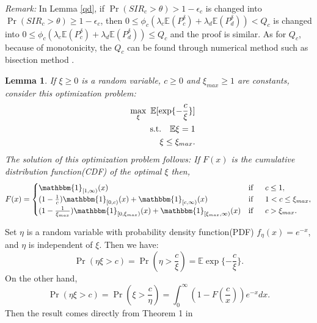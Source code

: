 \documentclass[12pt, draftclsnofoot, journal, letterpaper, onecolumn]{IEEEtran}
\newtheorem{lemma}{Lemma}[section]
\begin{document}
\emph{Remark:} In Lemma \ref{qd}, if $\Pr(SIR_c>\theta)>1-\epsilon_c$ is changed into $\Pr(SIR_c>\theta)\geq1-\epsilon_c$, then $0\leq\phi_c(\lambda_c\mathbb{E}(P_c^{\delta})+\lambda_d\mathbb{E}(P_d^{\delta}))<Q_c$ is changed into $0\leq\phi_c(\lambda_c\mathbb{E}(P_c^{\delta})+\lambda_d\mathbb{E}(P_d^{\delta}))\leq Q_c$ and the proof is similar.
As for $Q_c$, because of monotonicity, the $Q_c$ can be found through numerical method such as bisection method \cite{bisection}.

\begin{lemma}\label{max}
If $\xi\geq0$ is a random variable, $c\geq0$ and $\xi_{max}\geq1$ are constants, consider this optimization problem:
\begin{eqnarray*}
  && \max_\xi~ \mathbb{E}[\exp\{-\frac{c}{\xi}\}] \\
  &&{\rm s.t.}~~~ \mathbb{E}\xi=1\\
  && ~~~~~~~\xi\leq\xi_{max}.
\end{eqnarray*}
The solution of this optimization problem follows:
If $F(x)$ is the cumulative distribution function(CDF) of the optimal $\xi$ then,\\
\begin{eqnarray*}
F(x)=
\begin{cases}
\mathbbm{1}_{[1,\infty)}(x) & \text{if} \phantom{aaa} c\leq 1,\\
(1-\frac{1}{c})\mathbbm{1}_{[0,c)}(x)+\mathbbm{1}_{[c,\infty)}(x) & \text{if} \phantom{aaa} 1<c\leq\xi_{max},\\
(1-\frac{1}{\xi_{max}})\mathbbm{1}_{[0,\xi_{max})}(x)+\mathbbm{1}_{[\xi_{max},\infty)}(x) & \text{if} \phantom{aaa} c>\xi_{max}.
\end{cases}
\end{eqnarray*}
\end{lemma}
\begin{IEEEproof}
Set $\eta$ is a random variable with probability density function(PDF) $f_{\eta}(x)=e^{-x}$, and $\eta$ is independent of $\xi$.
Then we have:
\begin{equation*}
\Pr(\eta\xi>c)=\Pr(\eta>\frac{c}{\xi})=\mathbb{E}\exp\{-\frac{c}{\xi}\}.
\end{equation*}
On the other hand,
\begin{equation*}
\Pr(\eta\xi>c)=\Pr(\xi>\frac{c}{\eta})=\int^\infty_0(1-F(\frac{c}{x}))e^{-x}dx.
\end{equation*}
Then the result comes directly from Theorem 1 in \cite{RPC3}
\end{IEEEproof}
\end{document}
